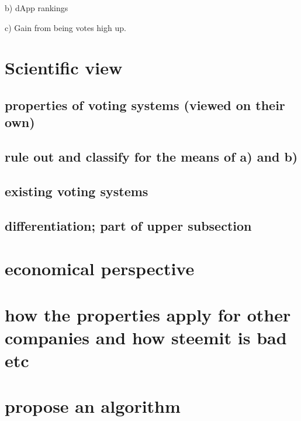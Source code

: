b) dApp rankings 

c) Gain from being votes high up.

\section{Scientific view}
\subsection{properties of voting systems (viewed on their own)} %
\subsection{rule out and classify for the means of a) and b)}

\subsection{existing voting systems}
\subsection{differentiation; part of upper subsection}

\section{economical perspective} %

\section{how the properties apply for other companies and how steemit is bad etc}

\section{propose an algorithm}



